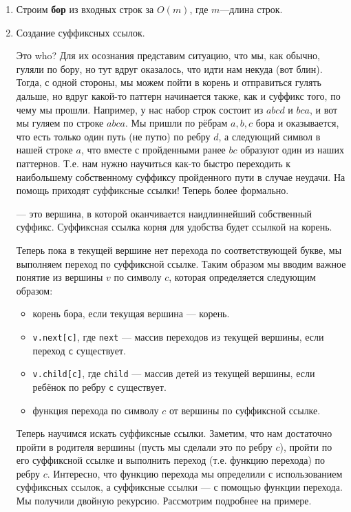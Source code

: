 \begin{enumerate}
  \item Строим \textbf{бор} из входных строк за $O(m)$, где  $m$---длина строк.
        \item Создание суффиксных ссылок.

        Это who? Для их осознания представим ситуацию, что мы, как обычно, гуляли по бору, но тут вдруг
        оказалось, что идти нам некуда (вот блин). Тогда, с одной стороны, мы можем пойти в корень и 
        отправиться гулять дальше, но вдруг какой-то паттерн начинается также, как и суффикс того, по чему 
        мы прошли. Например, у нас набор строк состоит из $abcd$ и  $bca$, и
        вот мы гуляем по строке $abca$. Мы пришли по рёбрам  $a, b, c$ бора и оказывается, что есть только
        один путь (не путю) по ребру $d$, а следующий символ в нашей строке $a$, что вместе с пройденными
        ранее $bc$ образуют один из наших паттернов. Т.е. нам нужно научиться как-то быстро переходить 
        к наибольшему собственному суффиксу пройденного пути в случае неудачи. На помощь приходят
        суффиксные ссылки! Теперь более формально.
        \begin{definition}
                 --- это вершина, в которой оканчивается наидлиннейший
                собственный суффикс. Суффиксная ссылка корня для удобства будет ссылкой на корень.
        \end{definition}
       Теперь пока в текущей вершине нет перехода по соответствующей букве, мы выполняем переход по
       суффиксной ссылке. Таким образом мы вводим важное понятие  из вершины $v$ 
       по символу $c$, которая определяется следующим образом:
       \begin{itemize}
                \item корень бора, если текущая вершина --- корень. 
                \item \texttt{v.next[c]}, где \texttt{next} --- массив переходов из текущей вершины, если
                переход \texttt{c} существует.
                \item \texttt{v.child[c]}, где \texttt{child} --- массив детей из текущей вершины,
                если ребёнок по ребру \texttt{c} существует.
                \item функция перехода по символу $c$ от вершины по суффиксной ссылке.
       \end{itemize}
       
       Теперь научимся искать суффиксные ссылки. Заметим, что нам достаточно пройти в родителя вершины
       (пусть мы сделали это по ребру $c$), пройти
       по его суффиксной ссылке и выполнить переход (т.е. функцию перехода) по ребру $c$. 
       Интересно, что функцию перехода мы определили с использованием суффиксных ссылок, а
       суффиксные ссылки --- с помощью функции перехода. Мы получили двойную рекурсию.
       Рассмотрим подробнее на примере.


\end{enumerate}
